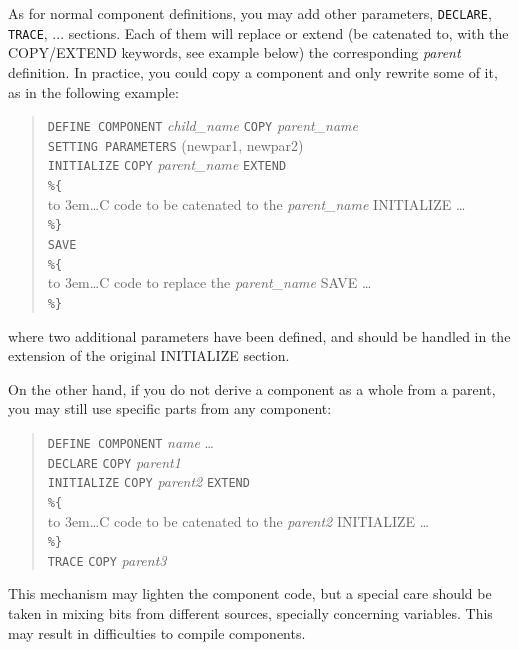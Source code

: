 As for normal component definitions, you may add other parameters, \texttt{DECLARE}, \texttt{TRACE}, ... sections. Each of them will replace or extend (be catenated to, with the COPY/EXTEND keywords, see example below) the corresponding \textit{parent} definition. In practice, you could copy a component and only rewrite some of it, as in the following example:
\begin{quote}
  \texttt{DEFINE COMPONENT} \textit{child\_name} \texttt{COPY} \textit{parent\_name} \\

  \texttt{SETTING PARAMETERS} (newpar1, newpar2) \\
  \texttt{INITIALIZE} \texttt{COPY} \textit{parent\_name} \texttt{EXTEND} \\
  \verb|%{|  \\
  \hbox to 3em{}\ldots C code to be catenated to the \textit{parent\_name} INITIALIZE \ldots  \\
  \verb|%}| \\
  \texttt{SAVE} \\
  \verb|%{|  \\
  \hbox to 3em{}\ldots C code to replace the \textit{parent\_name} SAVE \ldots  \\
  \verb|%}| \\
\end{quote}
where two additional parameters have been defined, and should be handled in the extension of the original INITIALIZE section.

On the other hand, if you do not derive a component as a whole from a parent, you may still use specific parts from any component:
\begin{quote}
  \texttt{DEFINE COMPONENT} \textit{name} \ldots \\
  \texttt{DECLARE} \texttt{COPY} \textit{parent1} \\
  \texttt{INITIALIZE} \texttt{COPY} \textit{parent2} \texttt{EXTEND} \\
  \verb|%{|  \\
  \hbox to 3em{}\ldots C code to be catenated to the \textit{parent2} INITIALIZE \ldots  \\
  \verb|%}| \\
  \texttt{TRACE} \texttt{COPY} \textit{parent3}
\end{quote}

This mechanism may lighten the component code, but a special care should be taken in mixing bits from different sources, specially concerning variables. This may result in difficulties to compile components.

